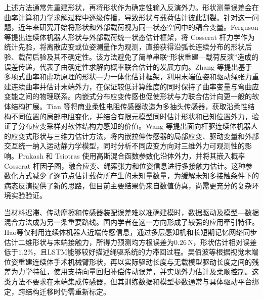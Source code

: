 上述方法通常先重建形状，再将形状作为确定性输入反演外力。形状测量误差会在曲率计算和力学求解过程中逐级传播，导致形状与载荷估计彼此割裂。针对这一问题，近年来研究开始将形状和外部载荷视为同一状态空间中的耦合变量。Ferguson 等提出连续体机器人形状与外部载荷统一状态估计框架，将 Cosserat 杆力学作为统计先验，将离散应变或位姿测量作为观测，直接获得沿弧长连续分布的形状后验、载荷后验及其不确定性。该方法避免了简单串联“形状重建—载荷反演”造成的误差传递，代表了由确定性求解向概率联合估计的发展方向\cite{ferguson2024unified}。Zhang 等提出基于多项式曲率和虚功原理的形状—力一体化估计框架，利用末端位姿和驱动绳张力重建连续曲率并估计末端外力，在保证较低计算维度的同时保持了曲率变量与弯曲应变能之间的物理联系\cite{zhang2025integrated}。内嵌式分布应变传感也促使形状与力联合估计向更一般的软体结构扩展。Tian 等将商业柔性电阻传感器改造为多抽头传感器，获取沿柔性结构不同位置的局部电阻变化，并结合有限元模型同时估计形状和已知位置外力，验证了分布应变采样对软体结构力感知的价值\cite{tian2024multitap}。Wang 等提出面向杆驱连续体机器人的应变式形状与三维力估计方法，将内嵌拉伸传感器的局部应变、驱动变量和外部交互统一纳入运动静力学模型，同时分析不同应变方向对三维外力可观测性的影响\cite{wang2026strain}。Prakash 和 Tsiotras 使用高斯混合函数参数化沿体外力，并将其嵌入概率 Cosserat 杆因子图，融合应变、绳索张力和位姿信息进行多接触力估计。这种参数化方式减少了逐节点估计载荷所产生的未知量数量，为缓解未知多接触条件下的病态反演提供了新的思路，但目前主要结果仍来自数值仿真，尚需更充分的复杂环境实验验证\cite{prakash2026multicontact}。

当材料迟滞、传动摩擦和传感器装配误差难以准确建模时，数据驱动及模型—数据混合方法成为另一条重要路线。国内学者在这一方向形成了较强的应用牵引特征。Hao等仅利用连续体机器人近端传感信息，通过多层感知机和长短期记忆网络同步估计二维形状与末端接触力，所得力预测均方根误差为$0.26\,\mathrm{N}$，形状估计相对误差低于$1.2\%$，且LSTM能够较好描述绳驱系统的力滞回过程\cite{hao2023two}。吴佰波等根据视觉末端位姿重建连续体手术机械臂形状，再以实际驱动长度与无载模型驱动长度之间的残差为力学特征，使用支持向量回归补偿传动误差，并实现外力估计及柔顺控制\cite{wu2023active}。这类方法不要求在末端集成传感器，但其训练数据和模型参数通常与具体驱动平台绑定，跨结构迁移时仍需重新标定。

